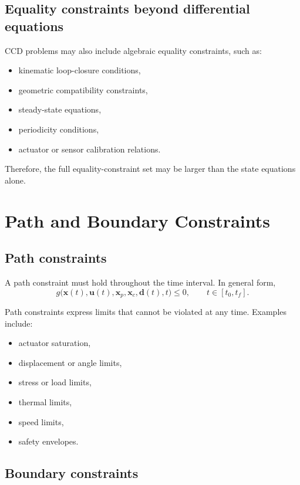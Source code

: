 \documentclass[11pt]{article}
\newcommand{\vect}[1]{\boldsymbol{#1}}
\newcommand{\xp}{\vect{x}_p}
\newcommand{\xc}{\vect{x}_c}
\newcommand{\xstate}{\vect{x}}
\newcommand{\uvec}{\vect{u}}
\newcommand{\dvec}{\vect{d}}
\begin{document}
\subsection{Equality constraints beyond differential equations}

CCD problems may also include algebraic equality constraints, such as:
\begin{itemize}[leftmargin=1.4em]
  \item kinematic loop-closure conditions,
  \item geometric compatibility constraints,
  \item steady-state equations,
  \item periodicity conditions,
  \item actuator or sensor calibration relations.
\end{itemize}

Therefore, the full equality-constraint set may be larger than the state equations alone.

\section{Path and Boundary Constraints}

\subsection{Path constraints}

A path constraint must hold throughout the time interval. In general form,
\begin{equation}
 g\big(\xstate(t),\uvec(t),\xp,\xc,\dvec(t),t\big) \le 0,
 \qquad t\in[t_0,t_f].
 \label{eq:ch4-path}
\end{equation}

Path constraints express limits that cannot be violated at any time. Examples include:
\begin{itemize}[leftmargin=1.4em]
  \item actuator saturation,
  \item displacement or angle limits,
  \item stress or load limits,
  \item thermal limits,
  \item speed limits,
  \item safety envelopes.
\end{itemize}

\subsection{Boundary constraints}
\end{document}
